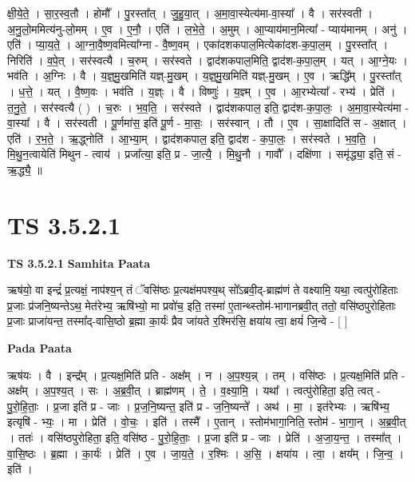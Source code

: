 \documentclass[17pt]{extarticle}
\begin{document}
क्षी॒ये॒ते॒ । सा॒र॒स्व॒तौ । होमौ᳚ । पु॒रस्ता᳚त् । जु॒हु॒या॒त् । अ॒मा॒वा॒स्येत्य॑मा-वा॒स्या᳚ । वै । सर॑स्वती । अ॒नु॒लो॒ममित्य॑नु-लो॒मम् । ए॒व । ए॒नौ॒ । एति॑ । ल॒भे॒ते॒ । अ॒मुम् । आ॒प्याय॑मान॒मित्या᳚ - प्याय॑मानम् । अनु॑ । एति॑ । प्या॒य॒ते॒ । आ॒ग्ना॒वै॒ष्ण॒वमित्या᳚ग्ना - वै॒ष्ण॒वम् । एका॑दशकपाल॒मित्येका॑दश-क॒पा॒ल॒म् । पु॒रस्ता᳚त् । निरिति॑ । व॒पे॒त् । सर॑स्वत्यै । च॒रुम् । सर॑स्वते । द्वाद॑शकपाल॒मिति॒ द्वाद॑श-क॒पा॒ल॒म् । यत् । आ॒ग्ने॒यः । भव॑ति । अ॒ग्निः । वै । य॒ज्ञ्॒मु॒खमिति॑ यज्ञ्-मु॒खम् । य॒ज्ञ्॒मु॒खमिति॑ यज्ञ्-मु॒खम् । ए॒व । ऋद्धि᳚म् । पु॒रस्ता᳚त् । ध॒त्ते॒ । यत् । वै॒ष्ण॒वः । भव॑ति । य॒ज्ञ्ः । वै । विष्णुः॑ । य॒ज्ञ्म् । ए॒व । आ॒रभ्येत्या᳚ - रभ्य॑ । प्रेति॑ । त॒नु॒ते॒ । सर॑स्वत्यै ( ) । च॒रुः । भ॒व॒ति॒ । सर॑स्वते । द्वाद॑शकपाल॒ इति॒ द्वाद॑श-क॒पा॒लः॒ । अ॒मा॒वा॒स्येत्य॑मा - वा॒स्या᳚ । वै । सर॑स्वती । पू॒र्णमा॑स॒ इति॑ पू॒र्ण - मा॒सः॒ । सर॑स्वान् । तौ । ए॒व । सा॒क्षादिति॑ स - अ॒क्षात् । एति॑ । र॒भ॒ते॒ । ऋ॒द्ध्नोति॑ । आ॒भ्या॒म् । द्वाद॑शकपाल॒ इति॒ द्वाद॑श - क॒पा॒लः॒ । सर॑स्वते । भ॒व॒ति॒ । मि॒थु॒न॒त्वायेति॑ मिथुन - त्वाय॑ । प्रजा᳚त्या॒ इति॒ प्र - जा॒त्यै॒ । मि॒थु॒नौ । गावौ᳚ । दक्षि॑णा । समृ॑द्ध्या॒ इति॒ सं - ऋ॒द्ध्यै॒ ॥  \newline





\section{ TS 3.5.2.1 }

\textbf{TS 3.5.2.1 } \newline
\textbf{Samhita Paata} \newline

ऋष॑यो॒ वा इन्द्रं॑ प्र॒त्यक्षं॒ नाप॑श्य॒न् तं ॅवसि॑ष्ठः प्र॒त्यक्ष॑मपश्य॒थ् सो᳚ऽब्रवी॒द्-ब्राह्म॑णं ते वक्ष्यामि॒ यथा॒ त्वत्पु॑रोहिताः प्र॒जाः प्र॑जनि॒ष्यन्तेऽथ॒ मेत॑रेभ्य॒ ऋषि॑भ्यो॒ मा प्रवो॑च॒ इति॒ तस्मा॑ ए॒तान्थ्स्तोम॑-भागानब्रवी॒त् ततो॒ वसि॑ष्ठपुरोहिताः प्र॒जाः प्राजा॑यन्त॒ तस्मा᳚द्-वासि॒ष्ठो ब्र॒ह्मा का॒र्यः॑ प्रैव जा॑यते र॒श्मिर॑सि॒ क्षया॑य त्वा॒ क्षयं॑ जि॒न्वे - [  ] \newline

\textbf{Pada Paata} \newline

ऋष॑यः । वै । इन्द्र᳚म् । प्र॒त्यक्ष॒मिति॑ प्रति - अक्ष᳚म् । न । अ॒प॒श्य॒न्न् । तम् । वसि॑ष्ठः । प्र॒त्यक्ष॒मिति॑ प्रति - अक्ष᳚म् । अ॒प॒श्य॒त् । सः । अ॒ब्र॒वी॒त् । ब्राह्म॑णम् । ते॒ । व॒क्ष्या॒मि॒ । यथा᳚ । त्वत्पु॑रोहिता॒ इति॒ त्वत् - पु॒रो॒हि॒ताः॒ । प्र॒जा इति॑ प्र - जाः । प्र॒ज॒नि॒ष्यन्त॒ इति॑ प्र - ज॒नि॒ष्यन्ते᳚ । अथ॑ । मा॒ । इत॑रेभ्यः । ऋषि॑भ्य॒ इत्यृषि॑ - भ्यः॒ । मा । प्रेति॑ । वो॒चः॒ । इति॑ । तस्मै᳚ । ए॒तान् । स्तोम॑भागा॒निति॒ स्तोम॑ - भा॒गा॒न् । अ॒ब्र॒वी॒त् । ततः॑ । वसि॑ष्ठपुरोहिता॒ इति॒ वसि॑ष्ठ - पु॒रो॒हि॒ताः॒ । प्र॒जा इति॑ प्र - जाः । प्रेति॑ । अ॒जा॒य॒न्त॒ । तस्मा᳚त् । वा॒सि॒ष्ठः । ब्र॒ह्मा । का॒र्यः॑ । प्रेति॑ । ए॒व । जा॒य॒ते॒ । र॒श्मिः । अ॒सि॒ । क्षया॑य । त्वा॒ । क्षय᳚म् । जि॒न्व॒ । इति॑ ।  \newline
\end{document}

